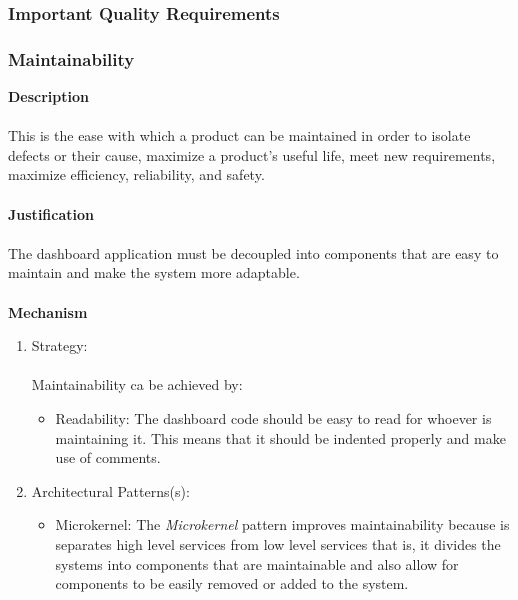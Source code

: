 \documentclass[hidelinks, 12pt, oneside]{article}
\begin{document}
		\subsubsection{Important Quality Requirements}
			\subsubsection*{Maintainability}
			\textbf{Description}\\\\
			This is the ease with which a product can be maintained in order to isolate defects or their cause, maximize a product's useful life, meet new requirements, maximize efficiency, reliability, and safety.\\\\
			\textbf{Justification}\\\\
			The dashboard application must be decoupled into components that are easy to maintain and make the system more adaptable.\\\\
			\textbf{Mechanism}
			\begin{enumerate}
				\item Strategy:\\\\
				Maintainability ca be achieved by:
				\begin{itemize}
				\item Readability: The dashboard code should be easy to read for whoever is maintaining it. This means that it should be indented properly and make use of comments. 
				\end{itemize}
				\item Architectural Patterns(s):
				\begin{itemize}
				\item Microkernel: The \emph{Microkernel} pattern improves maintainability because is separates high level services  from low level services that is, it divides the systems into components that are maintainable and also allow for components to be easily removed or added to the system.
				\end{itemize}
			\end{enumerate}
			\newpage
\end{document}
